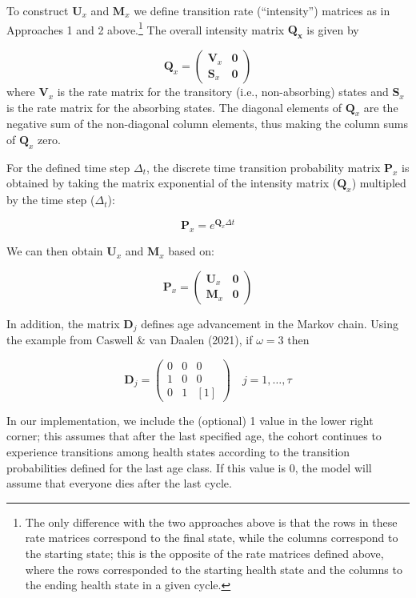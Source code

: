 \documentclass[
]{agujournal2019}
\begin{document}
To construct \(\mathbf{U}_x\) and \(\mathbf{M}_x\) we define transition
rate (``intensity'') matrices as in Approaches 1 and 2 above.\footnote{The
  only difference with the two approaches above is that the rows in
  these rate matrices correspond to the final state, while the columns
  correspond to the starting state; this is the opposite of the rate
  matrices defined above, where the rows corresponded to the starting
  health state and the columns to the ending health state in a given
  cycle.} The overall intensity matrix \(\mathbf{Q_x}\) is given by

\[
\mathbf{Q}_x=\left(\begin{array}{c|c}
\mathbf{V}_x & \mathbf{0} \\
\hline \mathbf{S}_x  & \mathbf{0}
\end{array}\right)
\] where \(\mathbf{V}_x\) is the rate matrix for the transitory (i.e.,
non-absorbing) states and \(\mathbf{S}_x\) is the rate matrix for the
absorbing states. The diagonal elements of \(\mathbf{Q}_x\) are the
negative sum of the non-diagonal column elements, thus making the column
sums of \(\mathbf{Q}_x\) zero.

For the defined time step \(\Delta_t\), the discrete time transition
probability matrix \(\mathbf{P}_x\) is obtained by taking the matrix
exponential of the intensity matrix (\(\mathbf{Q}_x\)) multipled by the
time step (\(\Delta_t\)):

\[
\mathbf{P}_x =e^{\mathbf{Q}_x  \Delta t}
\]

We can then obtain \(\mathbf{U}_x\) and \(\mathbf{M}_x\) based on:

\[
\mathbf{P}_x =\left(\begin{array}{c|c}
\mathbf{U}_x  & \mathbf{0} \\
\hline \mathbf{M}_x  & \mathbf{0}
\end{array}\right)
\]

In addition, the matrix \(\mathbf{D}_j\) defines age advancement in the
Markov chain. Using the example from Caswell \& van Daalen (2021), if
\(\omega=3\) then

\[
\mathbf{D}_j=\left(\begin{array}{ccc}
0 & 0 & 0 \\
1 & 0 & 0 \\
0 & 1 & {[1]}
\end{array}\right) \quad j=1, \ldots, \tau
\]

In our implementation, we include the (optional) 1 value in the lower
right corner; this assumes that after the last specified age, the cohort
continues to experience transitions among health states according to the
transition probabilities defined for the last age class. If this value
is 0, the model will assume that everyone dies after the last cycle.
\end{document}
